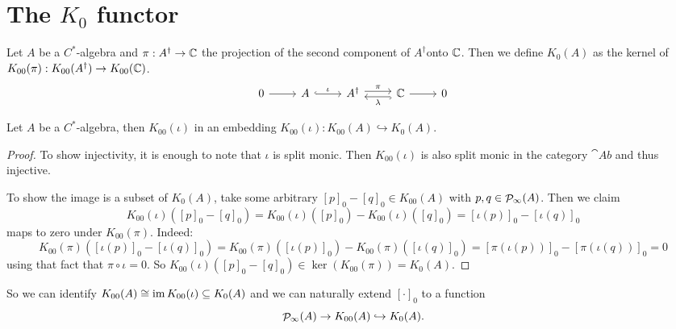 \section{The $K_{0}$ functor}
\begin{definition}
Let $A$ be a $C^*$-algebra and $\pi: A^\dagger \to \mathbb{C}$ the projection of the second component of $A^\dagger$onto $\mathbb{C}$. Then we define $K_0(A)$ as the kernel of $K_{00}(\pi): K_{00}(A^\dagger)\to K_{00}(\mathbb{C})$.
\[ \begin{tikzcd}
0 \rar & A \rar[hook, "\iota"] & A^\dagger \rar[shift left, "\pi"] & \lar[hook, shift left, "\lambda"] \C \rar & 0
\end{tikzcd} \]
\end{definition}
\begin{proposition} \label{K00embedsIntoK0}
Let $A$ be a $C^*$-algebra, then $K_{00}(\iota)$ in an embedding $K_{00}(\iota): K_{00}(A) \hookrightarrow K_{0}(A)$.
\end{proposition}
\begin{proof}
To show injectivity, it is enough to note that $\iota$ is split monic. Then $K_{00}(\iota)$ is also split monic in the category $\cat{Ab}$ and thus injective.

To show the image is a subset of $K_0(A)$, take some arbitrary $[p]_0-[q]_0\in K_{00}(A)$ with  $p,q\in\mathop{\mathcal{P}}\nolimits_\infty(A)$. Then we claim 
\[K_{00}(\iota)([p]_0-[q]_0) = K_{00}(\iota)([p]_0)-K_{00}(\iota)([q]_0) =  [\iota(p)]_0-[\iota(q)]_0\]
maps to zero under $K_{00}(\pi)$. Indeed:
\[ K_{00}(\pi)([\iota(p)]_0-[\iota(q)]_0) = K_{00}(\pi)([\iota(p)]_0) - K_{00}(\pi)([\iota(q)]_0) = [\pi(\iota(p))]_0 - [\pi(\iota(q))]_0 = 0 \]
using that fact that $\pi\circ\iota = 0$. So $K_{00}(\iota)([p]_0-[q]_0)\in\ker(K_{00}(\pi)) = K_0(A)$.
\end{proof}
So we can identify $K_{00}(A) \cong \operatorname{im} K_{00}(\iota) \subseteq K_0(A)$ and we can naturally extend $[\cdot]_{0}$ to a function
\[ \mathop{\mathcal{P}}\nolimits_\infty(A)\to K_{00}(A) \hookrightarrow K_0(A). \]

